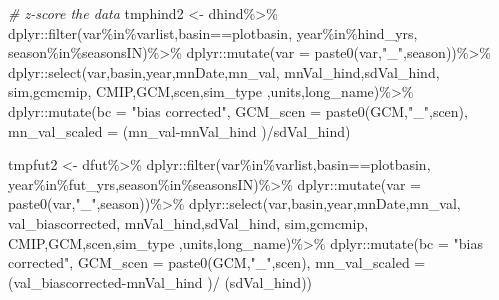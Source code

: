 \documentclass[
]{article}
\newenvironment{Shaded}{\begin{snugshade}}{\end{snugshade}}
\newcommand{\AttributeTok}[1]{\textcolor[rgb]{0.77,0.63,0.00}{#1}}
\newcommand{\CommentTok}[1]{\textcolor[rgb]{0.56,0.35,0.01}{\textit{#1}}}
\newcommand{\FunctionTok}[1]{\textcolor[rgb]{0.00,0.00,0.00}{#1}}
\newcommand{\NormalTok}[1]{#1}
\newcommand{\OtherTok}[1]{\textcolor[rgb]{0.56,0.35,0.01}{#1}}
\newcommand{\SpecialCharTok}[1]{\textcolor[rgb]{0.00,0.00,0.00}{#1}}
\newcommand{\StringTok}[1]{\textcolor[rgb]{0.31,0.60,0.02}{#1}}
\begin{document}
\begin{Shaded}
\begin{Highlighting}[]
      
       \CommentTok{\# z{-}score the data}
\NormalTok{       tmphind2    }\OtherTok{\textless{}{-}}\NormalTok{ dhind}\SpecialCharTok{\%\textgreater{}\%}
\NormalTok{         dplyr}\SpecialCharTok{::}\FunctionTok{filter}\NormalTok{(var}\SpecialCharTok{\%in\%}\NormalTok{varlist,basin}\SpecialCharTok{==}\NormalTok{plotbasin,}
\NormalTok{                       year}\SpecialCharTok{\%in\%}\NormalTok{hind\_yrs,}
\NormalTok{                       season}\SpecialCharTok{\%in\%}\NormalTok{seasonsIN)}\SpecialCharTok{\%\textgreater{}\%}
\NormalTok{         dplyr}\SpecialCharTok{::}\FunctionTok{mutate}\NormalTok{(}\AttributeTok{var =} \FunctionTok{paste0}\NormalTok{(var,}\StringTok{"\_"}\NormalTok{,season))}\SpecialCharTok{\%\textgreater{}\%}
\NormalTok{          dplyr}\SpecialCharTok{::}\FunctionTok{select}\NormalTok{(var,basin,year,mnDate,mn\_val, }
\NormalTok{                       mnVal\_hind,sdVal\_hind, sim,gcmcmip,}
\NormalTok{                       CMIP,GCM,scen,sim\_type ,units,long\_name)}\SpecialCharTok{\%\textgreater{}\%}
\NormalTok{         dplyr}\SpecialCharTok{::}\FunctionTok{mutate}\NormalTok{(}\AttributeTok{bc =} \StringTok{"bias corrected"}\NormalTok{,}
                       \AttributeTok{GCM\_scen =} \FunctionTok{paste0}\NormalTok{(GCM,}\StringTok{"\_"}\NormalTok{,scen),}
                       \AttributeTok{mn\_val\_scaled =}\NormalTok{ (mn\_val}\SpecialCharTok{{-}}\NormalTok{mnVal\_hind )}\SpecialCharTok{/}\NormalTok{sdVal\_hind)}
       
\NormalTok{       tmpfut2    }\OtherTok{\textless{}{-}}\NormalTok{ dfut}\SpecialCharTok{\%\textgreater{}\%}
\NormalTok{         dplyr}\SpecialCharTok{::}\FunctionTok{filter}\NormalTok{(var}\SpecialCharTok{\%in\%}\NormalTok{varlist,basin}\SpecialCharTok{==}\NormalTok{plotbasin,}
\NormalTok{                       year}\SpecialCharTok{\%in\%}\NormalTok{fut\_yrs,season}\SpecialCharTok{\%in\%}\NormalTok{seasonsIN)}\SpecialCharTok{\%\textgreater{}\%}
\NormalTok{         dplyr}\SpecialCharTok{::}\FunctionTok{mutate}\NormalTok{(}\AttributeTok{var =} \FunctionTok{paste0}\NormalTok{(var,}\StringTok{"\_"}\NormalTok{,season))}\SpecialCharTok{\%\textgreater{}\%}
\NormalTok{         dplyr}\SpecialCharTok{::}\FunctionTok{select}\NormalTok{(var,basin,year,mnDate,mn\_val, val\_biascorrected, }
\NormalTok{                       mnVal\_hind,sdVal\_hind, sim,gcmcmip,}
\NormalTok{                       CMIP,GCM,scen,sim\_type ,units,long\_name)}\SpecialCharTok{\%\textgreater{}\%}
\NormalTok{         dplyr}\SpecialCharTok{::}\FunctionTok{mutate}\NormalTok{(}\AttributeTok{bc =} \StringTok{"bias corrected"}\NormalTok{,}
                       \AttributeTok{GCM\_scen =} \FunctionTok{paste0}\NormalTok{(GCM,}\StringTok{"\_"}\NormalTok{,scen),}
                       \AttributeTok{mn\_val\_scaled =}\NormalTok{ (val\_biascorrected}\SpecialCharTok{{-}}\NormalTok{mnVal\_hind )}\SpecialCharTok{/}
\NormalTok{                         (sdVal\_hind))}
       

\end{Highlighting}
\end{Shaded}
\end{document}
